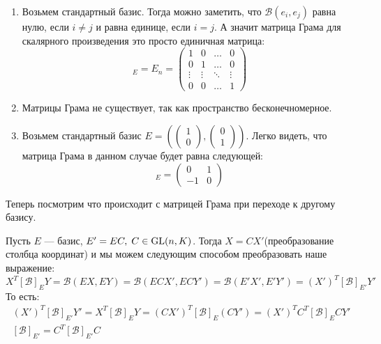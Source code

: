 \documentclass[../main.tex]{subfiles}
\begin{document}
\begin{examples}
  \begin{enumerate}
    \item Возьмем стандартный базис. Тогда можно заметить, что $\mathcal{B}(e_i, e_j)$ равна нулю, если $i \neq j$ и равна единице, если $i = j$. А значит матрица Грама для скалярного произведения это просто единичная матрица:
    \begin{equation*}
      [\mathcal{B}]_E = E_n = \begin{pmatrix}
        1 & 0 & \hdots & 0 \\
        0 & 1 & \hdots & 0 \\
        \vdots & \vdots & \ddots & \vdots \\
        0 & 0 & \hdots & 1
      \end{pmatrix}
    \end{equation*}

    \item Матрицы Грама не существует, так как пространство бесконечномерное.

    \item Возьмем стандартный базис $E = \left(
      \begin{pmatrix}
        1 \\ 0
      \end{pmatrix},
      \begin{pmatrix}
        0 \\ 1
      \end{pmatrix}
    \right)$. Легко видеть, что матрица Грама в данном случае будет равна следующей:
    \begin{equation*}
      [\mathcal{B}]_E = \begin{pmatrix}
        0 & 1 \\
        -1 & 0
      \end{pmatrix}
    \end{equation*}
  \end{enumerate}
\end{examples}

Теперь посмотрим что происходит с матрицей Грама при переходе к другому базису.

Пусть $E$ --- базис, $E' = EC, \; C \in \operatorname{GL}(n, K)$. Тогда $X = CX'$(преобразование столбца координат) и мы можем следующим способом преобразовать наше выражение:
\begin{equation*}
  X^T [\mathcal{B}]_E Y = \mathcal{B}(EX, EY) = \mathcal{B}(ECX', ECY') = \mathcal{B}(E'X', E'Y') = (X')^T [\mathcal{B}]_{E'} Y'
\end{equation*}
То есть:
\begin{equation*}
  \begin{gathered}
    (X')^T [\mathcal{B}]_{E'} Y' = X^T [\mathcal{B}]_E Y = (CX')^T [\mathcal{B}]_E (CY') =
    (X')^T C^T [\mathcal{B}]_E CY' \\
    [\mathcal{B}]_{E'} = C^T [\mathcal{B}]_{E'} C
  \end{gathered}
\end{equation*}
\end{document}
